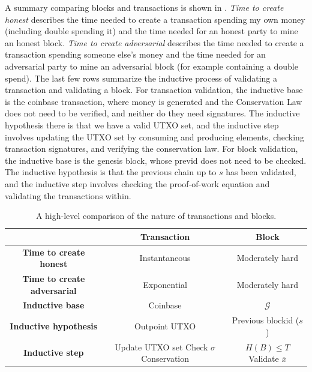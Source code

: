 A summary comparing blocks and transactions is shown in .
\emph{Time to create honest} describes the time needed to create a transaction spending my
own money (including double spending it) and the time needed for an honest party to mine an honest block.
\emph{Time to create adversarial} describes the time needed to create a transaction spending
someone else's money and the time needed for an adversarial party to mine an adversarial
block (for example containing a double spend). The last few rows summarize the inductive
process of validating a transaction and validating a block. For transaction validation, the
inductive base is the coinbase transaction, where money is generated and the Conservation Law
does not need to be verified, and neither do they need signatures.
The inductive hypothesis there is that we have a valid UTXO set,
and the inductive step involves updating the UTXO set by consuming and producing elements,
checking transaction signatures, and verifying the conservation law. For block validation,
the inductive base is the genesis block, whose previd does not need to be checked. The inductive
hypothesis is that the previous chain up to $s$ has been validated, and the inductive step
involves checking the proof-of-work equation and validating the transactions within.

\begin{table}
\centering
\begin{tabular}{ |c|c|c| }
  \hline
  & \textbf{Transaction} & \textbf{Block} \\
  \hline
  \textbf{Time to create honest} & Instantaneous & Moderately hard \\
  \hline
  \textbf{Time to create adversarial} & Exponential & Moderately hard \\
  \hline
  \textbf{Inductive base} & Coinbase & $\mathcal{G}$ \\
  \hline
  \textbf{Inductive hypothesis} & Outpoint UTXO & Previous blockid ($s$) \\
  \hline
  \textbf{Inductive step} & \makecell{Update UTXO set \\ Check $\sigma$ \\ Conservation} & \makecell{$H(B) \leq T$ \\ Validate $\overline{x}$} \\
  \hline
\end{tabular}
\caption{A high-level comparison of the nature of transactions and blocks.}
\label{tbl.tx-block-compare}
\end{table}

